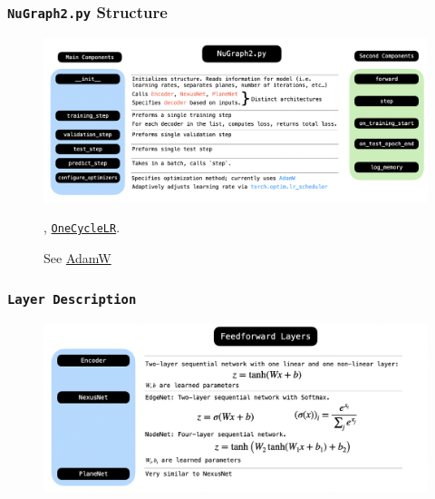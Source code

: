 \documentclass{beamer}
\begin{document}
\begin{frame}
	\frametitle{\texttt{NuGraph2.py} Structure}
		\begin{figure}[h!]
			\includegraphics[width=1\textwidth]{images/model2.png}
			\caption{See \href{https://pytorch.org/docs/stable/generated/torch.optim.AdamW.html}{\color{blue} AdamW}}, \href{https://pytorch.org/docs/stable/generated/torch.optim.lr_scheduler.OneCycleLR.html}{\color{blue} \texttt{OneCycleLR}}.
			\label{model2}
		\end{figure}
\end{frame}


\begin{frame}
	\frametitle{\texttt{Layer Description}}
		\begin{figure}[h!]
			\includegraphics[width=1\textwidth]{images/model3.png}
			\label{model3}
		\end{figure}
\end{frame}
\end{document}
